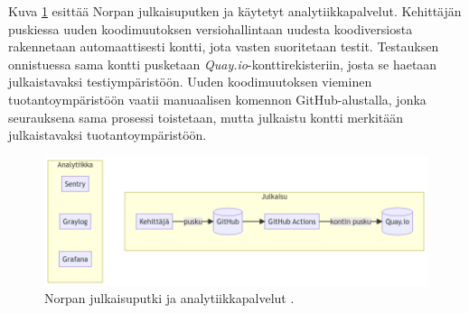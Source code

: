 Kuva \ref{fig:norppa:deployment} esittää Norpan julkaisuputken ja käytetyt analytiikkapalvelut.
Kehittäjän puskiessa uuden koodimuutoksen versiohallintaan uudesta koodiversiosta rakennetaan automaattisesti kontti, jota vasten suoritetaan testit.
Testauksen onnistuessa sama kontti pusketaan \textit{Quay.io}-konttirekisteriin, josta se haetaan julkaistavaksi testiympäristöön.
Uuden koodimuutoksen vieminen tuotantoympäristöön vaatii manuaalisen komennon GitHub-alustalla, jonka seurauksena sama prosessi toistetaan, mutta julkaistu kontti merkitään julkaistavaksi tuotantoympäristöön.

\begin{figure}[ht]
\begin{center}
\includegraphics[width=1\textwidth]{figures/norppa_deployment.png}
\caption{Norpan julkaisuputki ja analytiikkapalvelut \cite{Norppa23}\label{fig:norppa:deployment}.}
\end{center}
\end{figure}

